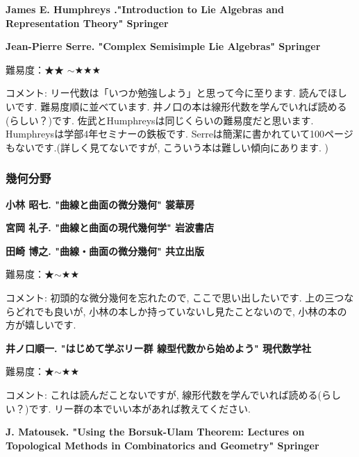 \textbf{James E. Humphreys ."Introduction to Lie Algebras and Representation Theory" Springer} \vspace{-6pt} 

\textbf{Jean-Pierre Serre. "Complex Semisimple Lie Algebras" Springer}  　\vspace{-6pt} 

難易度：★★ $\sim$★★★\vspace{-6pt} 

コメント: リー代数は「いつか勉強しよう」と思って今に至ります. 読んでほしいです. 
難易度順に並べています. 井ノ口の本は線形代数を学んでいれば読める(らしい？)です. 佐武とHumphreysは同じくらいの難易度だと思います. Humphreysは学部4年セミナーの鉄板です. Serreは簡潔に書かれていて100ページもないです.(詳しく見てないですが, こういう本は難しい傾向にあります. ) 
\vspace{8pt}


\subsubsection{幾何分野}


\textbf{小林 昭七. "曲線と曲面の微分幾何" 裳華房}  　\vspace{-6pt} 

\textbf{宮岡 礼子. "曲線と曲面の現代幾何学" 岩波書店}  　\vspace{-6pt} 

\textbf{田崎 博之. "曲線・曲面の微分幾何" 共立出版}  　\vspace{-6pt} 

難易度：★$\sim$★★ 　\vspace{-6pt} 

コメント: 初頭的な微分幾何を忘れたので, ここで思い出したいです. 
上の三つならどれでも良いが, 小林の本しか持っていないし見たことないので, 小林の本の方が嬉しいです. 
\vspace{8pt}

\textbf{井ノ口順一. "はじめて学ぶリー群 線型代数から始めよう" 現代数学社}  　\vspace{-6pt} 

難易度：★$\sim$★★ 　\vspace{-6pt} 

コメント: これは読んだことないですが, 線形代数を学んでいれば読める(らしい？)です. リー群の本でいい本があれば教えてください. 
\vspace{8pt}


\textbf{J. Matousek. "Using the Borsuk-Ulam Theorem: Lectures on Topological Methods in Combinatorics and Geometry" Springer}  　\vspace{-6pt} 

